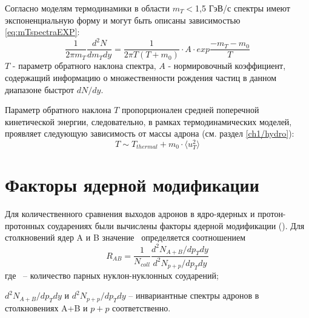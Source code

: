 Согласно моделям термодинамики \cite{Thermal1, Thermal2} в области $m_T<$1,5 ГэВ/с спектры имеют экспоненциальную форму и могут быть описаны  зависимостью \ref{eq:mTspectraEXP}:
\begin{equation}
	\label{eq:mTspectraEXP}
	\frac{1}{2\pi m_T} \frac{d^2 N}{dm_T dy}=\frac{1}{2\pi T (T+m_0)}\cdot A \cdot exp{\frac{-m_T -m_0}{T}}
\end{equation}
$T$ - параметр обратного наклона спектра, $A$ - нормировочный коэффициент, содержащий информацию о множественности рождения частиц в данном диапазоне быстрот $dN/dy$.

Параметр обратного наклона $T$ пропорционален средней поперечной кинетической энергии, следовательно, в рамках термодинамических моделей, проявляет следующую зависимость от массы адрона (см. раздел \ref{ch1/hydro}):
$$ T \sim T_{thermal}+m_0 \cdot \langle u_T ^2 \rangle$$


\section{Факторы ядерной модификации}
Для количественного сравнения выходов адронов в ядро-ядерных и протон-протонных соударениях были вычислены факторы ядерной модификации (\rab). Для столкновений ядер A и B значение \rab \ определяется соотношением
\begin{equation}
	\label{eq:rab}
	R_{AB}=\frac{1}{N_{coll}}\frac{d^2 N_{A+B}/dp_T dy}{d^2 N_{p+p}/dp_T dy} 
\end{equation}
где \Ncoll \ – количество парных нуклон-нуклонных соударений;
 
$d^2 N_{A+B}/dp_T dy$ и $d^2 N_{p+p}/dp_T dy$ – инвариантные спектры адронов в столкновениях A+B и $p+p$ соответственно.



